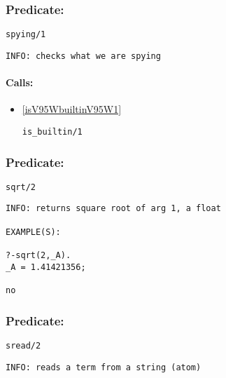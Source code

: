 \subsubsection{Predicate:} \label{spyingV95W1}

\begin{verbatim}
spying/1
\end{verbatim}

{\small \begin{verbatim}
INFO: checks what we are spying

\end{verbatim}}
\paragraph{Calls:} 
\begin{itemize}
\item \ref{isV95WbuiltinV95W1} 
\begin{verbatim}
is_builtin/1
\end{verbatim}

\end{itemize}

\subsubsection{Predicate:} \label{sqrtV95W2}

\begin{verbatim}
sqrt/2
\end{verbatim}

{\small \begin{verbatim}
INFO: returns square root of arg 1, a float

EXAMPLE(S):

?-sqrt(2,_A).
_A = 1.41421356;

no

\end{verbatim}}

\subsubsection{Predicate:} \label{sreadV95W2}

\begin{verbatim}
sread/2
\end{verbatim}

{\small \begin{verbatim}
INFO: reads a term from a string (atom)

\end{verbatim}}
